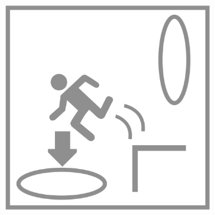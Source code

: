 \begin{figure}[H]
\begin{subfigure}[l]{0.195\linewidth}
  \end{subfigure}
  \begin{subfigure}[l]{0.195\linewidth}
    \includegraphics[width=\textwidth]{Sources/PortalIcons/d5.jpg}
  \end{subfigure}
  
  \vspace{1mm}
  

\end{figure}
